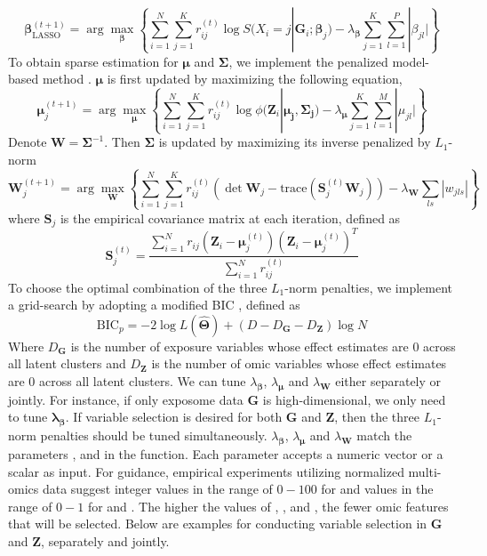 \begin{equation}
     \bm{\beta}_{\text{LASSO}}^{(t+1)} = \arg \max_{\bm{\beta}} \left\{ \sum_{i = 1}^N \sum_{j = 1}^K r_{ij}^{(t)}\log S(X_i = j | \bm{G}_i; \bm{\beta}_j) - \lambda_{\bm{\beta}}\sum_{j = 1}^K\sum_{l = 1}^P |\beta_{jl}| \right\}
     \label{eq14}
\end{equation}
To obtain sparse estimation for $\bm \mu$ and $\bm \Sigma$, we implement the penalized model-based method \citep{zhou2009penalized}. $\bm \mu$ is first updated by maximizing the following equation,
\begin{equation}
    \bm{\mu}_j^{(t+1)} = \arg \max_{\bm \mu} \left \{ \sum_{i = 1}^N \sum_{j = 1}^K r_{ij}^{(t)}\log \phi(\bm{Z}_i| \bm{\mu_j}, \bm{\Sigma_j}) - \lambda_{\bm{\mu}}\sum_{j = 1}^K\sum_{l = 1}^M |\mu_{jl}| \right \}
    \label{eq15}
\end{equation}
Denote $\bm{W} = \bm{\Sigma}^{-1}$. Then $\bm \Sigma$ is updated by maximizing its inverse penalized by $L_1$-norm
\begin{equation}
    \bm{W}_j^{(t+1)} = \arg \max_{\bm W} \left \{ \sum_{i = 1}^N \sum_{j = 1}^K r_{ij}^{(t)}\left( \det \bm{W}_j - \text{trace}(\bm{S}_j^{(t)} \bm{W}_j) \right) - \lambda_{\bm{W}}\sum_{ls}|w_{jls}| \right \}
    \label{eq16}
\end{equation}
where $\bm S_j$ is the empirical covariance matrix at each iteration, defined as 
\begin{equation}
    \bm{S}_j^{(t)} = \frac{\sum_{i=1}^N r_{ij}\left(\bm{Z}_i - \bm{\mu}_j^{(t)}\right)\left(\bm{Z}_i - \bm{\mu}_j^{(t)}\right)^T}{\sum_{i=1}^N r_{ij}^{(t)}}
    \label{eq17}
\end{equation}
To choose the optimal combination of the three $L_1$-norm penalties, we implement a grid-search by adopting a modified BIC \citep{pan2007penalized}, defined as 
\begin{equation}
    \text{BIC}_p = -2 \log L(\hat{\bm \Theta}) + (D - D_{\bm G} - D_{\bm Z})\log N
    \label{eq18}
\end{equation}
Where $D_{\bm G}$ is the number of exposure variables whose effect estimates are 0 across all latent clusters and $D_{\bm Z}$ is the number of omic variables whose effect estimates are 0 across all latent clusters. We can tune $\lambda_{\bm \beta}$, $\lambda_{\bm \mu}$ and $\lambda_{\bm W}$ either separately or jointly. For instance, if only exposome data $\bm G$ is high-dimensional, we only need to tune $\bm \lambda_{\bm \beta}$. If variable selection is desired for both $\bm G$ and $\bm Z$, then the three $L_1$-norm penalties should be tuned simultaneously. $\lambda_{\bm \beta}$, $\lambda_{\bm \mu}$ and $\lambda_{\bm W}$ match the parameters ,  and  in the  function. Each parameter accepts a numeric vector or a scalar as input. For guidance, empirical experiments utilizing normalized multi-omics data suggest integer values in the range of $0 - 100$ for  and values in the range of $0 - 1$ for  and . The higher the values of , , and , the fewer omic features that will be selected. Below are examples for conducting variable selection in $\bm G$ and $\bm Z$, separately and jointly.
